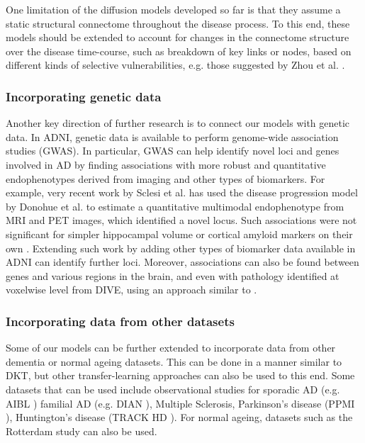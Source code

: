 One limitation of the diffusion models developed so far \cite{raj2015network, georgiadis2018computational} is that they assume a static structural connectome throughout the disease process. To this end, these models should be extended to account for changes in the connectome structure over the disease time-course, such as breakdown of key links or nodes, based on different kinds of selective vulnerabilities, e.g. those suggested by Zhou et al. \cite{zhou2012predicting}.

\subsubsection{Incorporating genetic data}
\label{sec:conMetGen}

Another key direction of further research is to connect our models with genetic data. In ADNI, genetic data is available to perform genome-wide association studies (GWAS). In particular, GWAS can help identify novel loci and genes involved in AD by finding associations with more robust and quantitative endophenotypes derived from imaging and other types of biomarkers. For example, very recent work by Sclesi et al. \cite{scelsi2018genetic} has used the disease progression model by Donohue et al. \cite{donohue2014estimating} to estimate a quantitative multimodal endophenotype from MRI and PET images, which identified a novel locus. Such associations were not significant for simpler hippocampal volume or cortical amyloid markers on their own \cite{scelsi2018genetic}. Extending such work by adding other types of biomarker data available in ADNI can identify further loci. Moreover, associations can also be found between genes and various regions in the brain, and even with pathology identified at voxelwise level from DIVE, using an approach similar to \cite{stein2010voxelwise}.

\subsubsection{Incorporating data from other datasets}
\label{sec:conMetOth}


Some of our models can be further extended to incorporate data from other dementia or normal ageing datasets. This can be done in a manner similar to DKT, but other transfer-learning approaches can also be used to this end. Some datasets that can be used include observational studies for sporadic AD (e.g. AIBL \cite{ellis2009australian}) familial AD (e.g. DIAN \cite{morris2012developing}), Multiple Sclerosis, Parkinson's disease (PPMI \cite{marek2011parkinson}), Huntington's disease (TRACK HD \cite{tabrizi2009biological}). For normal ageing, datasets such as the Rotterdam study \cite{ikram2017rotterdam} can also be used. 

